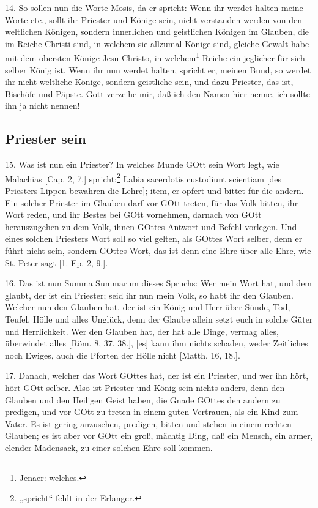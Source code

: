 14. So sollen nun die Worte Mosis, da er spricht: Wenn ihr werdet halten meine Worte etc., sollt ihr Priester und Könige sein, nicht verstanden werden von den weltlichen Königen, sondern innerlichen und geistlichen Königen im Glauben, die im Reiche Christi sind, in welchem sie allzumal Könige sind, gleiche Gewalt habe mit dem obersten Könige Jesu Christo, in welchem\footnote{Jenaer: welches.} Reiche ein jeglicher für sich selber König ist. Wenn ihr nun werdet halten, spricht er, meinen Bund, so werdet ihr nicht weltliche Könige, sondern geistliche sein, und dazu Priester, das ist, Bischöfe und Päpste. Gott verzeihe mir, daß ich den Namen hier nenne, ich sollte ihn ja nicht nennen!

\subsection{Priester sein}

15. Was ist nun ein Priester? In welches Munde GOtt sein Wort legt, wie Malachias [Cap. 2, 7.] spricht:\footnote{„spricht“ fehlt in der Erlanger.} Labia sacerdotis custodiunt
scientiam [des Priesters Lippen bewahren die Lehre]; item, er opfert und bittet für die andern. Ein solcher Priester im Glauben darf vor GOtt treten, für das Volk bitten, ihr Wort reden, und ihr Bestes bei GOtt vornehmen, darnach von GOtt herauszugehen zu dem Volk, ihnen GOttes Antwort und Befehl vorlegen. Und eines solchen Priesters Wort soll so viel gelten, als GOttes Wort selber, denn er führt nicht sein, sondern GOttes Wort, das ist denn eine Ehre über alle Ehre, wie St. Peter sagt [1. Ep. 2, 9.].

16. Das ist nun Summa Summarum dieses Spruchs: Wer mein Wort hat, und dem glaubt, der ist ein Priester; seid ihr nun mein Volk, so habt ihr den Glauben. Welcher nun den Glauben hat, der ist ein König und Herr über Sünde, Tod, Teufel, Hölle und alles Unglück, denn der Glaube allein setzt euch in solche Güter und Herrlichkeit. Wer den Glauben hat, der hat alle Dinge, vermag alles, überwindet alles [Röm. 8, 37. 38.], [es] kann ihm nichts schaden, weder Zeitliches noch Ewiges, auch die Pforten der Hölle nicht [Matth. 16, 18.].

17. Danach, welcher das Wort GOttes hat, der ist ein Priester, und wer ihn hört, hört GOtt selber. Also ist Priester und König sein nichts anders, denn den Glauben und den Heiligen Geist haben, die Gnade GOttes den andern zu predigen, und vor GOtt zu treten in einem guten Vertrauen, als ein Kind zum Vater. Es ist gering anzusehen, predigen, bitten und stehen in einem rechten Glauben; es ist aber vor GOtt ein groß, mächtig Ding, daß ein Mensch, ein armer, elender Madensack, zu einer solchen Ehre soll kommen.

